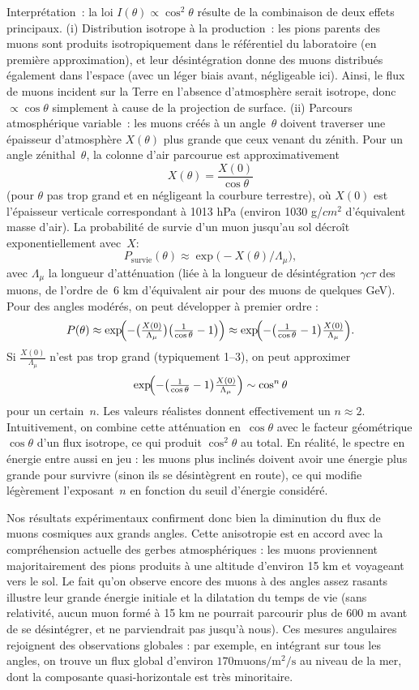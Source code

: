 \documentclass[a4paper,12pt,twoside]{article}
\begin{document}
Interprétation~: la loi $I(\theta)\propto\cos^2\theta$ résulte de la combinaison de deux effets principaux.  
(i) Distribution isotrope à la production~: les pions parents des muons sont produits isotropiquement dans le référentiel du laboratoire (en première approximation), et leur désintégration donne des muons distribués également dans l'espace (avec un léger biais avant, négligeable ici). Ainsi, le flux de muons incident sur la Terre en l'absence d'atmosphère serait isotrope, donc $\propto\cos\theta$ simplement à cause de la projection de surface.  
(ii) Parcours atmosphérique variable~: les muons créés à un angle~$\theta$ doivent traverser une épaisseur d'atmosphère $X(\theta)$ plus grande que ceux venant du zénith. Pour un angle zénithal~$\theta$, la colonne d'air parcourue est approximativement
\[
X(\theta)=\frac{X(0)}{\cos\theta}
\]
(pour $\theta$ pas trop grand et en négligeant la courbure terrestre), où $X(0)$ est l'épaisseur verticale correspondant à 1013 hPa (environ 1030 g/$cm^2$ d'équivalent masse d'air). La probabilité de survie d'un muon jusqu'au sol décroît exponentiellement avec~$X$:
\[
P_{\mathrm{survie}}(\theta)\approx\exp\bigl(-X(\theta)/\Lambda_{\mu}\bigr),
\]
avec $\Lambda_{\mu}$ la longueur d'atténuation (liée à la longueur de désintégration $\gamma c\tau$ des muons, de l'ordre de~6 km d'équivalent air pour des muons de quelques GeV). Pour des angles modérés, on peut développer à premier ordre :
\[
P(\theta)\approx \exp\!\Bigl(-\bigl(\tfrac{X(0)}{\Lambda_\mu}\bigr)\bigl(\tfrac1{\cos\theta}-1\bigr)\Bigr)\approx \exp\!\Bigl(-\bigl(\tfrac1{\cos\theta}-1\bigr)\tfrac{X(0)}{\Lambda_\mu}\Bigr).
\]
Si $\tfrac{X(0)}{\Lambda_\mu}$ n'est pas trop grand (typiquement 1--3), on peut approximer 
\[
\exp\!\Bigl(-\bigl(\tfrac1{\cos\theta}-1\bigr)\tfrac{X(0)}{\Lambda_\mu}\Bigr)\sim\cos^n\theta
\]
pour un certain~$n$. Les valeurs réalistes donnent effectivement un $n\approx2$. Intuitivement, on combine cette atténuation en~$\cos\theta$ avec le facteur géométrique $\cos\theta$ d'un flux isotrope, ce qui produit $\cos^2\theta$ au total. En réalité, le spectre en énergie entre aussi en jeu : les muons plus inclinés doivent avoir une énergie plus grande pour survivre (sinon ils se désintègrent en route), ce qui modifie légèrement l'exposant~$n$ en fonction du seuil d'énergie considéré.

Nos résultats expérimentaux confirment donc bien la diminution du flux de muons cosmiques aux grands angles. Cette anisotropie est en accord avec la compréhension actuelle des gerbes atmosphériques : les muons proviennent majoritairement des pions produits à une altitude d’environ 15 km et voyageant vers le sol. Le fait qu’on observe encore des muons à des angles assez rasants illustre leur grande énergie initiale et la dilatation du temps de vie (sans relativité, aucun muon formé à 15 km ne pourrait parcourir plus de 600 m avant de se désintégrer, et ne parviendrait pas jusqu’à nous). Ces mesures angulaires rejoignent des observations globales : par exemple, en intégrant sur tous les angles, on trouve un flux global d’environ $170\text{muons}/\text{m}^2/\text{s}$ au niveau de la mer, dont la composante quasi-horizontale est très minoritaire.
\end{document}
